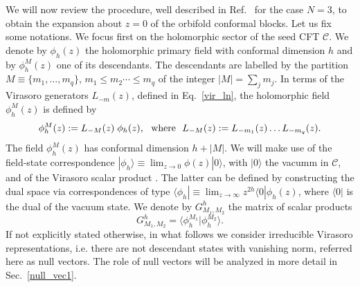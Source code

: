 \documentclass[a4paper,11pt]{article}
\begin{document}
We will now review the procedure, well described in Ref.~\cite{Collier} for the case $N=3$, to obtain the expansion about $z=0$ of the orbifold conformal blocks.  Let us fix some notations. We focus first on the holomorphic sector of the seed CFT $\mathcal{C}$. We denote by $\phi_{h}(z)$  the holomorphic primary field with conformal dimension $h$  and by $\phi_{h}^{M}(z)$ one of its descendants. The descendants are labelled by the partition  $M\equiv\{m_1,\dots,m_q\}$, $m_1\leq m_2\cdots\leq m_q$ of the integer  $|M|=\sum_{j} m_j$. In terms of the  Virasoro generators $L_{-m}(z)$, defined in Eq.~\eqref{vir_ln}, the holomorphic field $\phi_{h}^{M}(z)$ is defined by
\begin{equation}
\label{desc}
 \phi_{h}^{M}(z):=L_{-M}(z)\;\phi_h(z),~~{\rm{where}}~~ L_{-M}(z):=L_{-m_1}(z)\dots L_{-m_q}(z).
 \end{equation}
The field  $\phi_{h}^{M}(z)$ has conformal dimension $h+|M|$. We will make use of the field-state correspondence $|\phi_{h}\rangle\equiv \lim_{z\to 0}\phi(z)|0\rangle$, with $|0\rangle$ the vacumm in $\mathcal{C}$, and of the Virasoro scalar product \cite{DiFrancesco}. 
The latter can be defined  by constructing the dual space  via correspondences of type  $\langle \phi_{h} |\equiv\lim_{z\rightarrow\infty}z^{2h}\langle 0|\phi_h(z)$, where $\langle 0|$ is the dual of the vacuum state. We denote by  $G^{h}_{M_1,M_2}$ the matrix of scalar products
\begin{equation}
G^{h}_{M_1,M_2} = \langle \phi_{h}^{M_1}|\phi_{h}^{M_2}\rangle. 
\end{equation}
If not explicitly stated otherwise, in what follows we consider irreducible Virasoro representations, i.e. there are not descendant states with vanishing norm, referred here as null vectors. The role of null vectors will be analyzed in more detail in Sec.~\ref{null_vec1}.  
\end{document}
